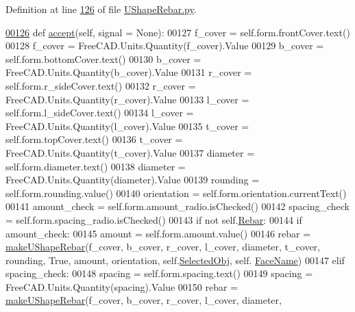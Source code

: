 Definition at line \hyperlink{UShapeRebar_8py_source_l00126}{126} of file \hyperlink{UShapeRebar_8py_source}{U\+Shape\+Rebar.\+py}.


\begin{DoxyCode}
\hypertarget{classUShapeRebar_1_1__UShapeRebarTaskPanel.tex_l00126}{}\hyperlink{classUShapeRebar_1_1__UShapeRebarTaskPanel_a9307d2a59f5d26ba7ce25b4603d78eb6}{00126}     \textcolor{keyword}{def }\hyperlink{classUShapeRebar_1_1__UShapeRebarTaskPanel_a9307d2a59f5d26ba7ce25b4603d78eb6}{accept}(self, signal = None):
00127         f\_cover = self.form.frontCover.text()
00128         f\_cover = FreeCAD.Units.Quantity(f\_cover).Value
00129         b\_cover = self.form.bottomCover.text()
00130         b\_cover = FreeCAD.Units.Quantity(b\_cover).Value
00131         r\_cover = self.form.r\_sideCover.text()
00132         r\_cover = FreeCAD.Units.Quantity(r\_cover).Value
00133         l\_cover = self.form.l\_sideCover.text()
00134         l\_cover = FreeCAD.Units.Quantity(l\_cover).Value
00135         t\_cover = self.form.topCover.text()
00136         t\_cover = FreeCAD.Units.Quantity(t\_cover).Value
00137         diameter = self.form.diameter.text()
00138         diameter = FreeCAD.Units.Quantity(diameter).Value
00139         rounding = self.form.rounding.value()
00140         orientation = self.form.orientation.currentText()
00141         amount\_check = self.form.amount\_radio.isChecked()
00142         spacing\_check = self.form.spacing\_radio.isChecked()
00143         \textcolor{keywordflow}{if} \textcolor{keywordflow}{not} self.\hyperlink{classUShapeRebar_1_1__UShapeRebarTaskPanel_a01238597180da20c197d4c02925814f6}{Rebar}:
00144             \textcolor{keywordflow}{if} amount\_check:
00145                 amount = self.form.amount.value()
00146                 rebar = \hyperlink{namespaceUShapeRebar_adb9f6e4b9ec41d7a1fdfe58ad174fec3}{makeUShapeRebar}(f\_cover, b\_cover, r\_cover, l\_cover, diameter, 
      t\_cover, rounding, \textcolor{keyword}{True}, amount, orientation, self.\hyperlink{classUShapeRebar_1_1__UShapeRebarTaskPanel_a74e2f5a2b08a8ae07513d6aa8ace25c6}{SelectedObj}, self.
      \hyperlink{classUShapeRebar_1_1__UShapeRebarTaskPanel_abc34324a2e2e788d505002fec92ab78f}{FaceName})
00147             \textcolor{keywordflow}{elif} spacing\_check:
00148                 spacing = self.form.spacing.text()
00149                 spacing = FreeCAD.Units.Quantity(spacing).Value
00150                 rebar = \hyperlink{namespaceUShapeRebar_adb9f6e4b9ec41d7a1fdfe58ad174fec3}{makeUShapeRebar}(f\_cover, b\_cover, r\_cover, l\_cover, diameter, 

\end{DoxyCode}
